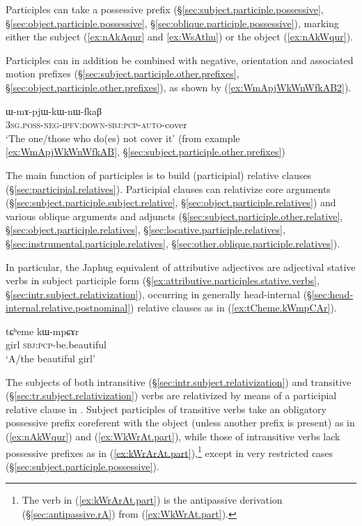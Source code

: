 Participles can take a possessive prefix (§\ref{sec:subject.participle.possessive}, §\ref{sec:object.participle.possessive}, §\ref{sec:oblique.participle.possessive}), marking either the subject (\ref{ex:nAkAqur} and \ref{ex:WsAthu}) or the object (\ref{ex:nAkWqur}).  

Participles can in addition be combined with negative, orientation and associated motion prefixes (§\ref{sec:subject.participle.other.prefixes}, §\ref{sec:object.participle.other.prefixes}), as shown by (\ref{ex:WmApjWkWnWfkAB2}).

\begin{exe}
\ex \label{ex:WmApjWkWnWfkAB2}
\gll ɯ-mɤ-pjɯ-kɯ-nɯ-fkaβ \\
\textsc{3sg}.\textsc{poss}-\textsc{neg}-\textsc{ipfv}:\textsc{down}-\textsc{sbj}:\textsc{pcp}-\textsc{auto}-cover \\
\glt `The one/those who do(es) not cover it' (from example \ref{ex:WmApjWkWnWfkAB}, §\ref{sec:subject.participle.other.prefixes})
\end{exe}

The main function of participles is to build (participial) relative clauses (§\ref{sec:participial.relatives}). Participial clauses can relativize core arguments (§\ref{sec:subject.participle.subject.relative}, §\ref{sec:object.participle.relatives}) and various oblique arguments and adjuncts (§\ref{sec:subject.participle.other.relative}, §\ref{sec:object.participle.relatives}, §\ref{sec:locative.participle.relatives}, §\ref{sec:instrumental.participle.relatives}, §\ref{sec:other.oblique.participle.relatives}).

In particular, the Japhug equivalent of attributive adjectives are adjectival stative verbs in subject participle form (§\ref{ex:attributive.participles.stative.verbs}, §\ref{sec:intr.subject.relativization}), occurring in generally head-internal (§\ref{sec:head-internal.relative.postnominal}) relative clauses as in (\ref{ex:tCheme.kWmpCAr}).

\begin{exe}
\ex \label{ex:tCheme.kWmpCAr}
\gll tɕʰeme kɯ-mpɕɤr \\
girl \textsc{sbj}:\textsc{pcp}-be.beautiful \\
\glt `A/the beautiful girl' 
\end{exe}

The subjects of both intransitive (§\ref{sec:intr.subject.relativization}) and transitive (§\ref{sec:tr.subject.relativization}) verbs are relativized by means of a participial relative clause in . Subject participles of transitive verbs take an obligatory possessive prefix coreferent with the object (unless another prefix is present) as in (\ref{ex:nAkWqur}) and (\ref{ex:WkWrAt.part}), while those of intransitive verbs lack possessive prefixes as in (\ref{ex:kWrArAt.part}),\footnote{The verb  in (\ref{ex:kWrArAt.part}) is the antipassive derivation (§\ref{sec:antipassive.rA}) from  (\ref{ex:WkWrAt.part}). } except in very restricted cases (§\ref{sec:subject.participle.possessive}).

